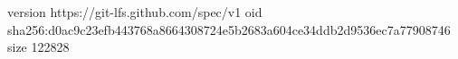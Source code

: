 version https://git-lfs.github.com/spec/v1
oid sha256:d0ac9c23efb443768a8664308724e5b2683a604ce34ddb2d9536ec7a77908746
size 122828

